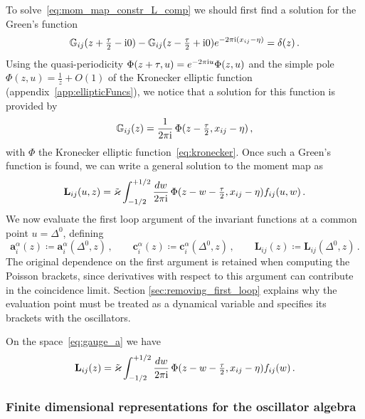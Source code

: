 To solve~\eqref{eq:mom_map_constr_L_comp} we should first find a solution for the Green's function
\begin{equation}
\label{eq:eq_for_Green_fun}
\mathbb{G}_{ij}(z+\tfrac{\tau}{2}-\mathrm{i} 0) -  \mathbb{G}_{ij}(z-\tfrac{\tau}{2}+\mathrm{i} 0) e^{-2\pi\mathrm{i} (x_{ij} -\eta)} = \delta(z) \,.
\end{equation}
Using the quasi-periodicity $\Phi(z+\tau,u)=e^{-2\pi\mathrm{i} u}\Phi(z,u)$ and the simple pole $\Phi(z,u) = \frac{1}{z} + O(1)$ of the Kronecker elliptic function (appendix~\ref{app:ellipticFuncs}), we notice that a solution for this function is provided by
\begin{equation}
\mathbb{G}_{ij}(z) = \frac{1}{2 \pi \mathrm{i} } \, \Phi(z-\tfrac{\tau}{2}, x_{ij}- \eta) \,,
\end{equation}
with $\Phi$ the Kronecker elliptic function~\eqref{eq:kronecker}. Once such a Green's function is found, we can write a general solution to the moment map as
\begin{equation}
\label{eq:Loperator_general_sol}
\mathbf{L}_{ij}(u,z) = \tilde{\varkappa} \int^{+1/2}_{-1/2} \frac{dw}{2 \pi \mathrm{i} } \,  \Phi(z-w-\tfrac{\tau}{2}, x_{ij}- \eta) f_{ij}(u, w) \,.
\end{equation}
We now evaluate the first loop argument of the invariant functions at a common point $u=\Delta^0$, defining
\begin{equation}
\label{eq:gauge_a}
\mathbf{a}_i^\alpha(z) \coloneq \mathbf{a}_i^\alpha(\Delta^0, z) \,, \qquad \mathbf{c}_i^\alpha(z) \coloneq \mathbf{c}_i^\alpha(\Delta^0, z) \,, \qquad \mathbf{L}_{ij}(z) \coloneq \mathbf{L}_{ij}(\Delta^0,z) \,.
\end{equation}
The original dependence on the first argument is retained when computing the Poisson brackets, since derivatives with respect to this argument can contribute in the coincidence limit. Section \ref{sec:removing_first_loop} explains why the evaluation point must be treated as a dynamical variable and specifies its brackets with the oscillators.

On the space~\eqref{eq:gauge_a} we have
\begin{equation}
\label{eq:Loperator_general_sol2}
\mathbf{L}_{ij}(z) = \tilde{\varkappa} \int^{+1/2}_{-1/2} \frac{dw}{2 \pi \mathrm{i} } \,  \Phi(z-w-\tfrac{\tau}{2}, x_{ij}- \eta) f_{ij}(w) \,.
\end{equation}

\subsubsection{Finite dimensional representations for the oscillator algebra} \label{sec:finite_dim_osc_alg}

